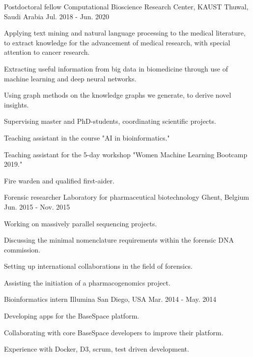\begin{cventries}
  \cventry
    {Postdoctoral fellow} %
    {Computational Bioscience Research Center, KAUST} %
    {Thuwal, Saudi Arabia} %
    {Jul. 2018 - Jun. 2020} %
    {
      \begin{cvitems} %
        \item {Applying text mining and natural language processing to the medical literature, to extract knowledge for the advancement of medical research, with special attention to cancer research.}
        \item {Extracting useful information from big data in biomedicine through use of machine learning and deep neural networks.}
        \item {Using graph methods on the knowledge graphs we
            generate, to derive novel insights.}
      \item {Supervising master and PhD-students, coordinating
          scientific projects.}
      \item {Teaching assistant in the course "AI in bioinformatics."}
      \item {Teaching assistant for the 5-day workshop "Women Machine
          Learning Bootcamp 2019."}
      \item {Fire warden and qualified first-aider.}
      \end{cvitems}
    }

  \cventry
    {Forensic researcher} %
    {Laboratory for pharmaceutical biotechnology} %
    {Ghent, Belgium} %
    {Jun. 2015 - Nov. 2015} %
    {
      \begin{cvitems} %
        \item {Working on massively parallel sequencing projects.}
        \item {Discussing the minimal nomenclature requirements within
          the forensic DNA commission.}
        \item {Setting up international collaborations in the field of
            forensics.}
        \item {Assisting the initiation of a pharmacogenomics project.}
      \end{cvitems}
    }

  \cventry
    {Bioinformatics intern} %
    {Illumina} %
    {San Diego, USA} %
    {Mar. 2014 - May. 2014} %
    {
      \begin{cvitems} %
        \item {Developing apps for the BaseSpace platform.}
        \item {Collaborating with core BaseSpace developers to improve
            their platform.}
        \item {Experience with Docker, D3, scrum, test driven development.}
      \end{cvitems}
    }


\end{cventries}
